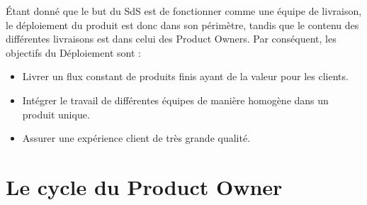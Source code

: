\documentclass[12pt,a4paper,parskip=full]{scrartcl}
\begin{document}
Étant donné que le but du SdS est de fonctionner comme une équipe de livraison, le
déploiement du produit est donc dans son périmètre, tandis que le contenu des
différentes livraisons est dans celui des Product Owners. Par conséquent, les objectifs
du Déploiement sont :
\begin{itemize}
\item Livrer un flux constant de produits finis ayant de la valeur pour les clients.
\item Intégrer le travail de différentes équipes de manière homogène dans un produit
unique.
\item Assurer une expérience client de très grande qualité.
\end{itemize}

\section{Le cycle du Product Owner}
\end{document}
